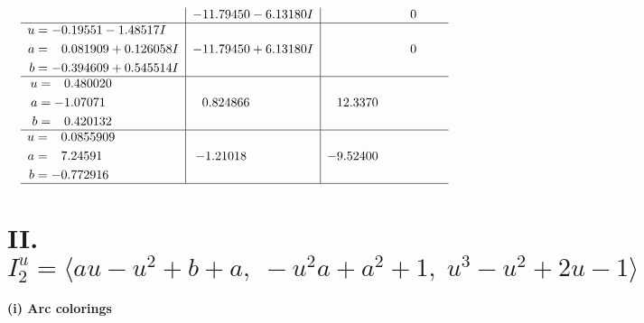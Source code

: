 \documentclass[1p]{elsarticle_modified}
\theoremstyle{definition}
\begin{document}
$$\begin{array}{c|c|c}
 & -11.79450 - 6.13180 I & \phantom{-0.000000 } 0 \\ \hline\begin{aligned}
u &= -0.19551 - 1.48517 I \\
a &= \phantom{-}0.081909 + 0.126058 I \\
b &= -0.394609 + 0.545514 I\end{aligned}
 & -11.79450 + 6.13180 I & \phantom{-0.000000 } 0 \\ \hline\begin{aligned}
u &= \phantom{-}0.480020\phantom{ +0.000000I} \\
a &= -1.07071\phantom{ +0.000000I} \\
b &= \phantom{-}0.420132\phantom{ +0.000000I}\end{aligned}
 & \phantom{-}0.824866\phantom{ +0.000000I} & \phantom{-}12.3370\phantom{ +0.000000I} \\ \hline\begin{aligned}
u &= \phantom{-}0.0855909\phantom{ +0.000000I} \\
a &= \phantom{-}7.24591\phantom{ +0.000000I} \\
b &= -0.772916\phantom{ +0.000000I}\end{aligned}
 & -1.21018\phantom{ +0.000000I} & -9.52400\phantom{ +0.000000I}\\
 \hline 
 \end{array}$$\newpage\newpage\renewcommand{\arraystretch}{1}
\centering \section*{II. $I^u_{2}= \langle a u- u^2+b+a,\;- u^2 a+a^2+1,\;u^3- u^2+2 u-1 \rangle$}
\flushleft \textbf{(i) Arc colorings}\\
\end{document}
